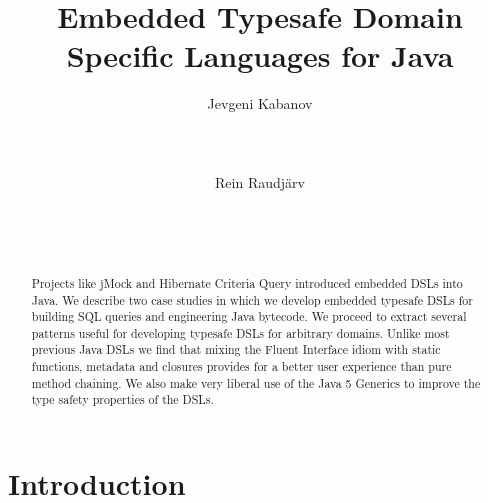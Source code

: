 \documentclass{sig-alternate}
\begin{document}
\setlength{\pdfpageheight}{11in}
\setlength{\pdfpagewidth}{8.5in}

\title{Embedded Typesafe Domain Specific Languages for Java} 

\author{
	\alignauthor 
		Jevgeni Kabanov\\
       \\
       \\
       \\
	\alignauthor 
		Rein Raudj\"arv\\
       \\
       \\
       \\
}

\date{}

\maketitle

\begin{abstract}
Projects like jMock and Hibernate Criteria Query introduced embedded DSLs into Java. We describe two case studies in which we develop embedded typesafe DSLs for building SQL queries and engineering Java bytecode. We proceed to extract several patterns useful for developing typesafe DSLs for arbitrary domains. Unlike most previous Java DSLs we find that mixing the Fluent Interface idiom with static functions, metadata and closures provides for a better user experience than pure method chaining. We also make very liberal use of the Java 5 Generics to improve the type safety properties of the DSLs.
\end{abstract}


\section{Introduction}
\end{document}
